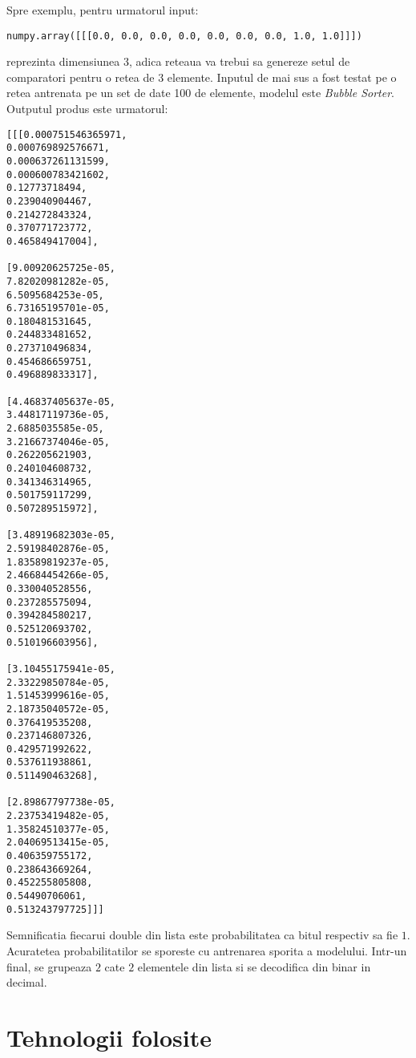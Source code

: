\documentclass[12pt]{article}
\begin{document}
Spre exemplu, pentru urmatorul input:

\begin{center}
\begin{lstlisting}
numpy.array([[[0.0, 0.0, 0.0, 0.0, 0.0, 0.0, 0.0, 1.0, 1.0]]])
\end{lstlisting}
\end{center}

reprezinta dimensiunea 3, adica reteaua va trebui sa genereze setul de comparatori pentru o retea de 3 elemente. Inputul de mai sus a fost testat pe o retea antrenata pe un set de date 100 de elemente, modelul este \textit{Bubble Sorter}. Outputul produs este urmatorul:
\begin{center}
\begin{multicols}{2}
\begin{lstlisting}
[[[0.000751546365971,
0.000769892576671,
0.000637261131599,
0.000600783421602,
0.12773718494,
0.239040904467,
0.214272843324,
0.370771723772,
0.465849417004],

[9.00920625725e-05,
7.82020981282e-05,
6.5095684253e-05,
6.73165195701e-05,
0.180481531645,
0.244833481652,
0.273710496834,
0.454686659751,
0.496889833317],

[4.46837405637e-05,
3.44817119736e-05,
2.6885035585e-05,
3.21667374046e-05,
0.262205621903,
0.240104608732,
0.341346314965,
0.501759117299,
0.507289515972],

[3.48919682303e-05,
2.59198402876e-05,
1.83589819237e-05,
2.46684454266e-05,
0.330040528556,
0.237285575094,
0.394284580217,
0.525120693702,
0.510196603956],

[3.10455175941e-05,
2.33229850784e-05,
1.51453999616e-05,
2.18735040572e-05,
0.376419535208,
0.237146807326,
0.429571992622,
0.537611938861,
0.511490463268],

[2.89867797738e-05,
2.23753419482e-05,
1.35824510377e-05,
2.04069513415e-05,
0.406359755172,
0.238643669264,
0.452255805808,
0.54490706061,
0.513243797725]]]
\end{lstlisting}
\end{multicols}
\end{center}

Semnificatia fiecarui double din lista este probabilitatea ca bitul respectiv sa fie $1$. Acuratetea probabilitatilor se sporeste cu antrenarea sporita a modelului. Intr-un final, se grupeaza $2$ cate $2$ elementele din lista si se decodifica din binar in decimal.

\section{Tehnologii folosite}
\end{document}
